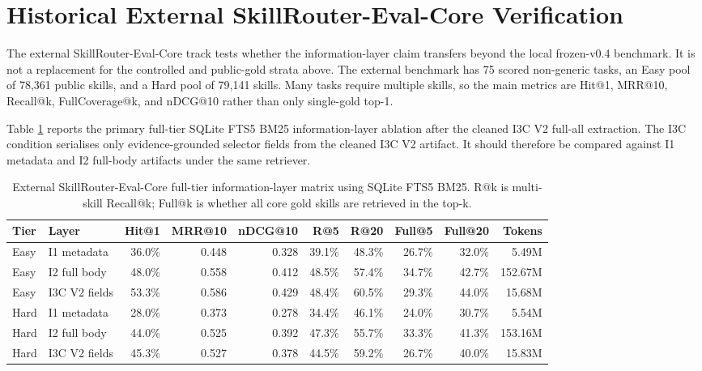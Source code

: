 \section{Historical External SkillRouter-Eval-Core Verification}

The external SkillRouter-Eval-Core track tests whether the information-layer claim transfers beyond the local frozen-v0.4 benchmark. It is not a replacement for the controlled and public-gold strata above. The external benchmark has 75 scored non-generic tasks, an Easy pool of 78,361 public skills, and a Hard pool of 79,141 skills. Many tasks require multiple skills, so the main metrics are Hit@1, MRR@10, Recall@k, FullCoverage@k, and nDCG@10 rather than only single-gold top-1.

Table \ref{tab:external-skillrouter-i3c-v2} reports the primary full-tier SQLite FTS5 BM25 information-layer ablation after the cleaned I3C V2 full-all extraction. The I3C condition serialises only evidence-grounded selector fields from the cleaned I3C V2 artifact. It should therefore be compared against I1 metadata and I2 full-body artifacts under the same retriever.

\begin{table}[h]
\centering
\tiny
\setlength{\tabcolsep}{1.5pt}
\begin{tabular}{p{}p{}rrrrrrrr}
\toprule
Tier & Layer & Hit@1 & MRR@10 & nDCG@10 & R@5 & R@20 & Full@5 & Full@20 & Tokens \\
\midrule
Easy & I1 metadata & 36.0\% & 0.448 & 0.328 & 39.1\% & 48.3\% & 26.7\% & 32.0\% & 5.49M \\
Easy & I2 full body & 48.0\% & 0.558 & 0.412 & 48.5\% & 57.4\% & 34.7\% & 42.7\% & 152.67M \\
Easy & I3C V2 fields & 53.3\% & 0.586 & 0.429 & 48.4\% & 60.5\% & 29.3\% & 44.0\% & 15.68M \\
\midrule
Hard & I1 metadata & 28.0\% & 0.373 & 0.278 & 34.4\% & 46.1\% & 24.0\% & 30.7\% & 5.54M \\
Hard & I2 full body & 44.0\% & 0.525 & 0.392 & 47.3\% & 55.7\% & 33.3\% & 41.3\% & 153.16M \\
Hard & I3C V2 fields & 45.3\% & 0.527 & 0.378 & 44.5\% & 59.2\% & 26.7\% & 40.0\% & 15.83M \\
\bottomrule
\end{tabular}
\caption{External SkillRouter-Eval-Core full-tier information-layer matrix using SQLite FTS5 BM25. R@k is multi-skill Recall@k; Full@k is whether all core gold skills are retrieved in the top-k.}
\label{tab:external-skillrouter-i3c-v2}
\end{table}

